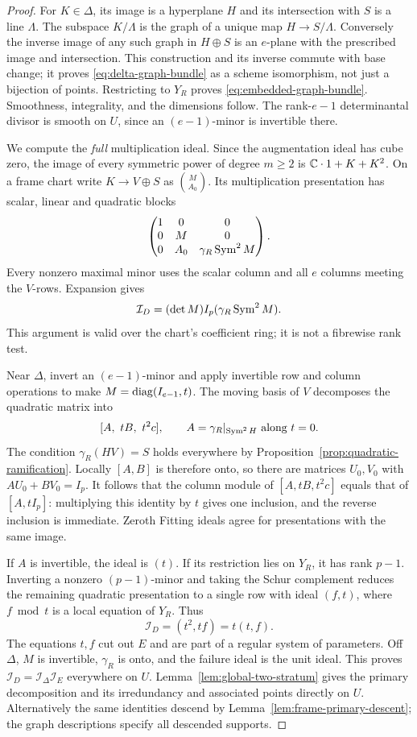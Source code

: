 \begin{proof}
For $K\in\Delta$, its image is a hyperplane $H$ and its
intersection with $S$ is a line $\Lambda$. The subspace $K/\Lambda$
is the graph of a unique map $H\to S/\Lambda$. Conversely the
inverse image of any such graph in $H\oplus S$ is an $e$-plane
with the prescribed image and intersection. This construction and
its inverse commute with base change; it proves
\eqref{eq:delta-graph-bundle} as a scheme isomorphism, not just a
bijection of points. Restricting to $Y_R$ proves
\eqref{eq:embedded-graph-bundle}. Smoothness, integrality, and the
dimensions follow. The rank-$e-1$ determinantal divisor is smooth
on $U$, since an $(e-1)$-minor is invertible there.

We compute the \emph{full} multiplication ideal. Since the
augmentation ideal has cube zero, the image of every symmetric
power of degree $m\ge2$ is $\mathbb C\cdot1+K+K^2$. On a frame chart
write $K\to V\oplus S$ as $\binom{M}{A_0}$. Its multiplication
presentation has scalar, linear and quadratic blocks
\[
 \begin{pmatrix}
 1&0&0\\ 0&M&0\\0&A_0&\gamma_R\operatorname{Sym}^2M
 \end{pmatrix}.
\]
Every nonzero maximal minor uses the scalar column and all $e$
columns meeting the $V$-rows. Expansion gives
\[
 \mathcal I_D=(\det M)I_p(\gamma_R\operatorname{Sym}^2M).
\]
This argument is valid over the chart's coefficient ring; it is
not a fibrewise rank test.

Near $\Delta$, invert an $(e-1)$-minor and apply invertible row
and column operations to make $M=\operatorname{diag}(I_{e-1},t)$. The moving
basis of $V$ decomposes the quadratic matrix into
\[
 [A,\ tB,\ t^2c],\qquad A=\gamma_R|_{\Sym^2H}
              \text{ along }t=0.
\]
The condition $\gamma_R(HV)=S$ holds everywhere by
Proposition~\ref{prop:quadratic-ramification}. Locally $[A,B]$
is therefore onto, so there are matrices $U_0,V_0$ with
$AU_0+BV_0=I_p$. It follows that the column module of
$[A,tB,t^2c]$ equals that of $[A,tI_p]$: multiplying this identity
by $t$ gives one inclusion, and the reverse inclusion is immediate.
Zeroth Fitting ideals agree for presentations with the same image.

If $A$ is invertible, the ideal is $(t)$. If its restriction
lies on $Y_R$, it has rank $p-1$. Inverting a nonzero $(p-1)$-minor
and taking the Schur complement reduces the remaining quadratic
presentation to a single row with ideal $(f,t)$, where $f\bmod t$
is a local equation of $Y_R$. Thus
\begin{equation}\label{eq:ramification-local-model}
 \mathcal I_D=(t^2,tf)=t(t,f).
\end{equation}
The equations $t,f$ cut out $E$ and are part of a regular system
of parameters. Off $\Delta$, $M$ is invertible, $\gamma_R$ is
onto, and the failure ideal is the unit ideal. This proves
$\mathcal I_D=\mathcal I_\Delta\mathcal I_E$ everywhere on $U$.
Lemma~\ref{lem:global-two-stratum} gives the primary decomposition
and its irredundancy and associated points directly on $U$.
Alternatively the same identities descend by
Lemma~\ref{lem:frame-primary-descent}; the graph descriptions
specify all descended supports.


\end{proof}
